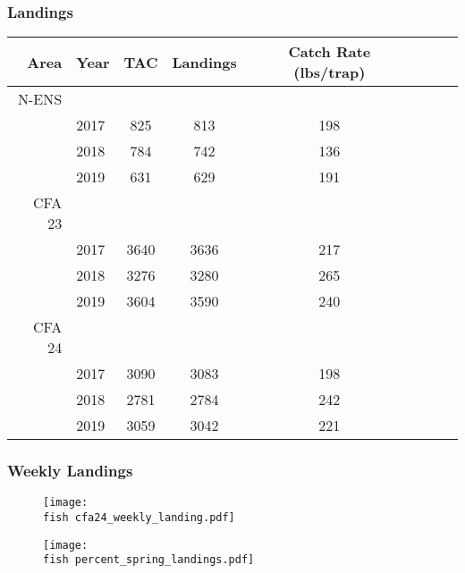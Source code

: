 \documentclass{beamer}
\begin{document}
	\begin{frame}
		\frametitle{Landings}
		
		\begin{table}[ht]
			\centering
			\begin{tabular}{rlccclrr}
				\hline
				Area & Year & TAC & Landings & Catch Rate (lbs/trap) \\ 
				\hline
				N-ENS & & & & \\
				& 2017 & 825 & 813 & 198 \\
				& 2018 & 784 & 742 & 136 \\
				& 2019 & 631 & 629 & 191 \\
				\hline
				CFA 23 & & & & \\
				& 2017 & 3640 & 3636 & 217 \\
				& 2018 & 3276 & 3280 & 265 \\
				& 2019 & 3604 & 3590 & 240 \\
				\hline
				CFA 24 & & & & \\
				& 2017 & 3090 & 3083 & 198 \\
				& 2018 & 2781 & 2784 & 242 \\
				& 2019 & 3059 & 3042 & 221 \\
				
				\hline
				\hline
			\end{tabular}
		\end{table}
		
		
		
	\end{frame}
	
	
	
	
	
	\begin{frame}
		\frametitle{Weekly Landings}
		\begin{figure}
			
			\vspace*{-0.5cm}
			\centerline{\texttt{[image: \\fish cfa24\_weekly\_landing.pdf]}}
			
		\end{figure}
	\end{frame}
	
	
	\begin{frame}
		\begin{figure}
			
			\vspace*{-0.25cm}
			\centerline{\texttt{[image: \\fish percent\_spring\_landings.pdf]}}
			
		\end{figure}
	\end{frame}
	
\end{document}
